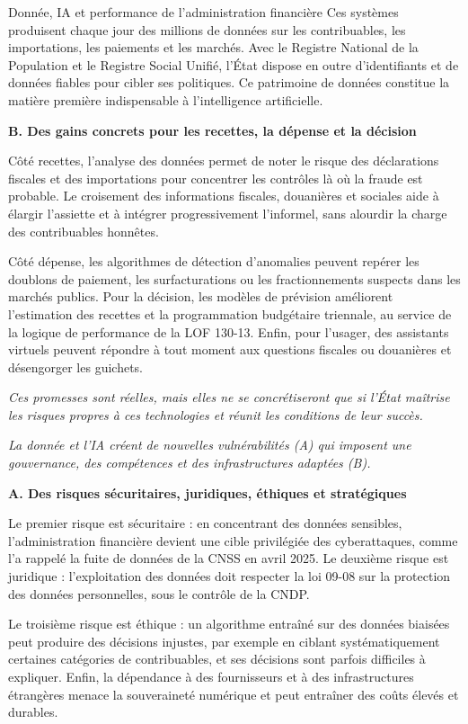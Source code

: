 \begin{copiemodele}{Donnée, IA et performance de l'administration financière}
Ces systèmes produisent chaque jour des millions de données sur les contribuables, les importations, les paiements et les marchés. Avec le Registre National de la Population et le Registre Social Unifié, l'État dispose en outre d'identifiants et de données fiables pour cibler ses politiques. Ce patrimoine de données constitue la matière première indispensable à l'intelligence artificielle.

\textbf{B. Des gains concrets pour les recettes, la dépense et la décision}

Côté recettes, l'analyse des données permet de noter le risque des déclarations fiscales et des importations pour concentrer les contrôles là où la fraude est probable. Le croisement des informations fiscales, douanières et sociales aide à élargir l'assiette et à intégrer progressivement l'informel, sans alourdir la charge des contribuables honnêtes.

Côté dépense, les algorithmes de détection d'anomalies peuvent repérer les doublons de paiement, les surfacturations ou les fractionnements suspects dans les marchés publics. Pour la décision, les modèles de prévision améliorent l'estimation des recettes et la programmation budgétaire triennale, au service de la logique de performance de la LOF 130-13. Enfin, pour l'usager, des assistants virtuels peuvent répondre à tout moment aux questions fiscales ou douanières et désengorger les guichets.

\textit{Ces promesses sont réelles, mais elles ne se concrétiseront que si l'État maîtrise les risques propres à ces technologies et réunit les conditions de leur succès.}

\textit{La donnée et l'IA créent de nouvelles vulnérabilités (A) qui imposent une gouvernance, des compétences et des infrastructures adaptées (B).}

\textbf{A. Des risques sécuritaires, juridiques, éthiques et stratégiques}

Le premier risque est sécuritaire : en concentrant des données sensibles, l'administration financière devient une cible privilégiée des cyberattaques, comme l'a rappelé la fuite de données de la CNSS en avril 2025. Le deuxième risque est juridique : l'exploitation des données doit respecter la loi 09-08 sur la protection des données personnelles, sous le contrôle de la CNDP.

Le troisième risque est éthique : un algorithme entraîné sur des données biaisées peut produire des décisions injustes, par exemple en ciblant systématiquement certaines catégories de contribuables, et ses décisions sont parfois difficiles à expliquer. Enfin, la dépendance à des fournisseurs et à des infrastructures étrangères menace la souveraineté numérique et peut entraîner des coûts élevés et durables.


\end{copiemodele}
